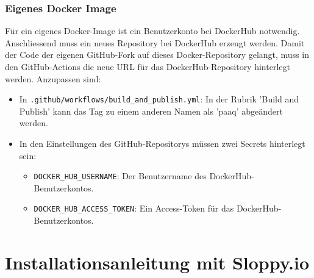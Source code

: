 \documentclass[../main.tex]{subfiles}
\begin{document}
	\subsubsection{Eigenes Docker Image}
	\par Für ein eigenes Docker-Image ist ein Benutzerkonto bei DockerHub notwendig. Anschliessend muss ein neues Repository bei DockerHub erzeugt werden. Damit der Code der eigenen GitHub-Fork auf dieses Docker-Repository gelangt, muss in den GitHub-Actions die neue URL für das DockerHub-Repository hinterlegt werden. Anzupassen sind:
	\begin{itemize}
		\item In \texttt{.github/workflows/build\_and\_publish.yml}: In der Rubrik 'Build and Publish' kann das Tag zu einem anderen Namen als 'paaq' abgeändert werden.
		\item In den Einstellungen des GitHub-Repositorys müssen zwei Secrets hinterlegt sein:
		\begin{itemize}
			\item \texttt{DOCKER\_HUB\_USERNAME}: Der Benutzername des DockerHub-Benutzerkontos.
			\item \texttt{DOCKER\_HUB\_ACCESS\_TOKEN}: Ein Access-Token für das DockerHub-Benutzerkontos.
		\end{itemize}
	\end{itemize}
	
	
	\section{Installationsanleitung mit Sloppy.io}
\end{document}
